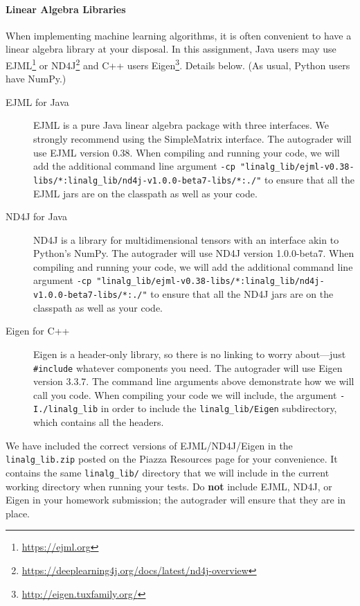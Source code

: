 \documentclass[11pt,addpoints,answers]{exam}
\begin{document}
\begin{notebox}
\paragraph{Linear Algebra Libraries} When implementing machine learning algorithms, it is often convenient to have a linear algebra library at your disposal. In this assignment, Java users may use EJML\footnote{\url{https://ejml.org}} or ND4J\footnote{\url{https://deeplearning4j.org/docs/latest/nd4j-overview}} and C++ users Eigen\footnote{\url{http://eigen.tuxfamily.org/}}. Details below. 
%
(As usual, Python users have NumPy.)
%
\begin{description}
\item[EJML for Java] EJML is a pure Java linear algebra package with three interfaces. We strongly recommend using the SimpleMatrix interface. The autograder will use EJML version 0.38. When compiling and running your code, we will add the additional command line argument \small{\lstinline{-cp "linalg_lib/ejml-v0.38-libs/*:linalg_lib/nd4j-v1.0.0-beta7-libs/*:./"}}
to ensure that all the EJML jars are on the classpath as well as your code. 

\item[ND4J for Java] ND4J is a library for multidimensional tensors with an interface akin to Python's NumPy. The autograder will use ND4J version 1.0.0-beta7. When compiling and running your code, we will add the additional command line argument \small{\lstinline{-cp "linalg_lib/ejml-v0.38-libs/*:linalg_lib/nd4j-v1.0.0-beta7-libs/*:./"}} to ensure that all the ND4J jars are on the classpath as well as your code. 

\item[Eigen for C++] Eigen is a header-only library, so there is no linking to worry about---just \lstinline{#include} whatever components you need. The autograder will use Eigen version 3.3.7. The command line arguments above demonstrate how we will call you code. When compiling your code we will include, the argument \lstinline{-I./linalg_lib} in order to include the \lstinline{linalg_lib/Eigen} subdirectory, which contains all the headers.

\end{description} 
We have included the correct versions of EJML/ND4J/Eigen in the \lstinline{linalg_lib.zip} posted on the Piazza Resources page for your convenience. It contains the same \lstinline{linalg_lib/} directory that we will include in the current working directory when running your tests. Do {\bf not} include EJML, ND4J, or Eigen in your homework submission; the autograder will ensure that they are in place. 
\end{notebox}
\end{document}
